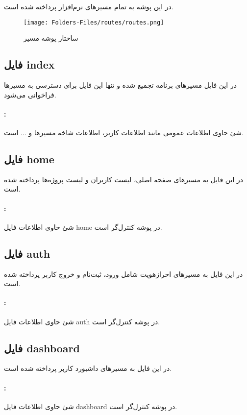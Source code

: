 
در این پوشه به تمام مسیر‌های نرم‌افزار پرداخته شده است.
\begin{figure}[H]
	\texttt{[image: Folders-Files/routes/routes.png]}
	\centering
	\caption{ساختار پوشه مسیر}
	\label{fig:folder:routes}
\end{figure}

\subsection{فایل index}
در این فایل مسیرهای برنامه تجمیع شده و تنها این فایل برای دسترسی به مسیرها فراخوانی می‌شود.

\paragraph{:}
شئ حاوی اطلاعات عمومی مانند اطلاعات کاربر، اطلاعات شاخه مسیرها و ... است.

\subsection{فایل home}
در این فایل به مسیرهای صفحه اصلی، لیست کاربران و لیست پروژه‌ها پرداخته شده است.
\paragraph{:}
شئ حاوی اطلاعات فایل home در پوشه کنترل‌گر است.

\subsection{فایل auth}
در این فایل به مسیرهای احرازهویت شامل ورود، ثبت‌نام و خروج کاربر پرداخته شده است.

\paragraph{:}
شئ حاوی اطلاعات فایل auth در پوشه کنترل‌گر است.

\subsection{فایل dashboard}
در این فایل به مسیرهای داشبورد کاربر پرداخته شده است.

\paragraph{:}
شئ حاوی اطلاعات فایل dashboard در پوشه کنترل‌گر است.

